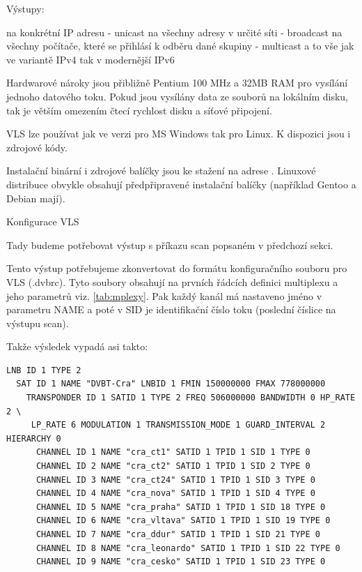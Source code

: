 Výstupy:

\vspace{10pt}

na konkrétní IP adresu - unicast
na všechny adresy v určité síti - broadcast
na všechny počítače, které se přihlásí k odběru dané skupiny - multicast
a to vše jak ve variantě IPv4 tak v modernější IPv6

\vspace{10pt}

Hardwarové nároky jsou přibližně Pentium 100 MHz a 32MB RAM pro vysílání jednoho datového toku. Pokud jsou vysílány data ze souborů na lokálním disku, tak je větším omezením čtecí rychlost disku a síťové připojení.

\vspace{10pt}

VLS lze používat jak ve verzi pro MS Windows tak pro Linux. K dispozici jsou i zdrojové kódy.

\vspace{10pt}

Instalační binární i zdrojové balíčky jsou ke stažení na adrese \cite{videolanURL}.
Linuxové distribuce obvykle obsahují předpřipravené instalační balíčky (například Gentoo a Debian mají). 

\vspace{10pt}

Konfigurace VLS
\vspace{10pt}

Tady budeme potřebovat výstup s příkazu scan popsaném v předchozí sekci.

Tento výstup potřebujeme zkonvertovat do formátu konfiguračního souboru pro VLS (.dvbrc). Tyto soubory obsahují na prvních řádcích definici multiplexu a jeho parametrů viz. \ref{tab:mplexy}. Pak každý kanál má nastaveno jméno v parametru NAME a poté v SID je identifikační číslo toku (poslední číslice na výstupu scan).

Takže výsledek vypadá asi takto:

\vspace{10pt}

\begin{small}
\begin{verbatim}
LNB ID 1 TYPE 2
  SAT ID 1 NAME "DVBT-Cra" LNBID 1 FMIN 150000000 FMAX 778000000
    TRANSPONDER ID 1 SATID 1 TYPE 2 FREQ 506000000 BANDWIDTH 0 HP_RATE 2 \
     LP_RATE 6 MODULATION 1 TRANSMISSION_MODE 1 GUARD_INTERVAL 2 HIERARCHY 0
      CHANNEL ID 1 NAME "cra_ct1" SATID 1 TPID 1 SID 1 TYPE 0
      CHANNEL ID 2 NAME "cra_ct2" SATID 1 TPID 1 SID 2 TYPE 0
      CHANNEL ID 3 NAME "cra_ct24" SATID 1 TPID 1 SID 3 TYPE 0
      CHANNEL ID 4 NAME "cra_nova" SATID 1 TPID 1 SID 4 TYPE 0
      CHANNEL ID 5 NAME "cra_praha" SATID 1 TPID 1 SID 18 TYPE 0
      CHANNEL ID 6 NAME "cra_vltava" SATID 1 TPID 1 SID 19 TYPE 0
      CHANNEL ID 7 NAME "cra_ddur" SATID 1 TPID 1 SID 21 TYPE 0
      CHANNEL ID 8 NAME "cra_leonardo" SATID 1 TPID 1 SID 22 TYPE 0
      CHANNEL ID 9 NAME "cra_cesko" SATID 1 TPID 1 SID 23 TYPE 0
\end{verbatim}
\end{small}

